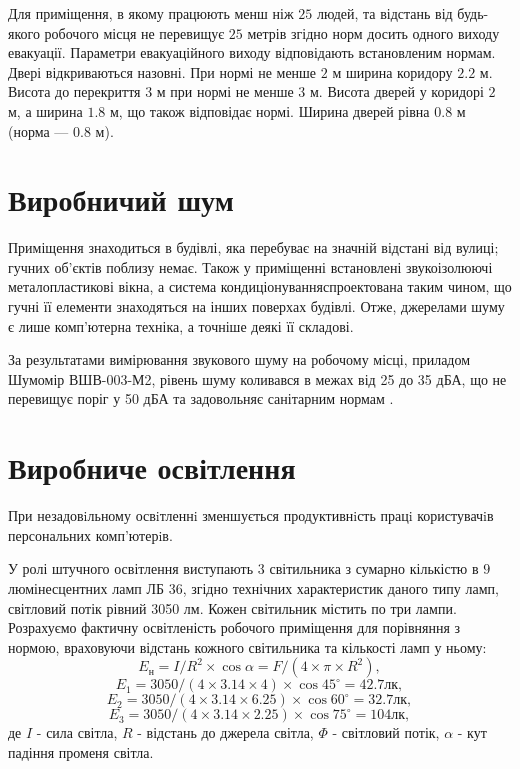 Для приміщення, в якому працюють менш ніж $25$ людей, та відстань від будь-якого
робочого місця не перевищує $25$ метрів згідно норм досить одного виходу
евакуації. Параметри евакуаційного виходу відповідають встановленим нормам.
Двері відкриваються назовні.
При нормі не менше $2$ м ширина коридору $2.2$ м.
Висота до перекриття $3$ м при нормі не менше $3$ м.
Висота дверей у коридорі $2$ м, а ширина $1.8$ м, що також відповідає нормі.
Ширина дверей рівна $0.8$ м  (норма --- $0.8$ м).

\section{Виробничий шум}

Приміщення знаходиться в будівлі, яка перебуває на значній відстані від вулиці;
гучних об’єктів поблизу немає.
Також у приміщенні встановлені звукоізолюючі металопластикові вікна,
а система кондиціонуванняспроектована таким чином,
що гучні її елементи знаходяться на інших поверхах будівлі.
Отже, джерелами шуму є лише комп’ютерна техніка, а точніше деякі її складові.

За результатами вимірювання звукового шуму на робочому місці,
приладом Шумомір ВШВ-003-М2, рівень шуму коливався в межах від 25 до 35 дБА, 
що не перевищує поріг у 50 дБА та задовольняє санітарним нормам \cite{DSanPiN}.

\section{Виробниче освітлення}

При незадовiльному освiтленнi зменшується продуктивнiсть працi
користувачiв персональних комп’ютерiв.

У ролі штучного освітлення виступають $3$ світильника з сумарно кількістю в
$9$ люмінесцентних ламп ЛБ 36, згідно технічних характеристик даного типу ламп,
світловий потік рівний 3050 лм.
Кожен світильник містить по три  лампи. 
Розрахуємо фактичну освітленість робочого приміщення для порівняння з нормою,
враховуючи відстань кожного світильника та кількості ламп у ньому:
\begin{equation*}
  E_{\text{н}} = I/R^{2} \times \cos\alpha = F/(4 \times \pi \times R^{2} ),
\end{equation*}
\begin{equation*}
  E_{1} = 3050/(4\times 3.14\times 4)\times \cos{45^{\circ}} = 42.7 \text{лк},
\end{equation*}
\begin{equation*}
  E_{2} = 3050/(4\times 3.14\times 6.25)\times \cos{60^{\circ}} = 32.7\text{лк},
\end{equation*}
\begin{equation*}
  E_{3} = 3050/(4\times 3.14\times 2.25)\times \cos{75^{\circ}} = 104 \text{лк},
\end{equation*}
де $I$ - сила світла, $R$ - відстань до джерела світла, 
$\Phi$ - світловий потік, $\alpha$ - кут падіння променя світла.

